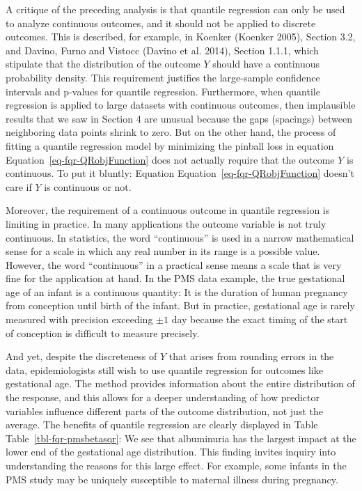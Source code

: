 \documentclass[
  letterpaper,
  DIV=11,
  numbers=noendperiod]{scrartcl}
\begin{document}
A critique of the preceding analysis is that quantile regression can
only be used to analyze continuous outcomes, and it should not be
applied to discrete outcomes. This is described, for example, in Koenker
(Koenker 2005), Section 3.2, and Davino, Furno and Vistocc (Davino et
al. 2014), Section 1.1.1, which stipulate that the distribution of the
outcome \(Y\) should have a continuous probability density. This
requirement justifies the large-sample confidence intervals and p-values
for quantile regression. Furthermore, when quantile regression is
applied to large datasets with continuous outcomes, then implausible
results that we saw in Section 4 are unusual because the gaps (spacings)
between neighboring data points shrink to zero. But on the other hand,
the process of fitting a quantile regression model by minimizing the
pinball loss in equation Equation~\ref{eq-fqr-QRobjFunction} does not
actually require that the outcome \(Y\) is continuous. To put it
bluntly: Equation Equation~\ref{eq-fqr-QRobjFunction} doesn't care if
\(Y\) is continuous or not.

Moreover, the requirement of a continuous outcome in quantile regression
is limiting in practice. In many applications the outcome variable is
not truly continuous. In statistics, the word ``continuous'' is used in
a narrow mathematical sense for a scale in which any real number in its
range is a possible value. However, the word ``continuous'' in a
practical sense means a scale that is very fine for the application at
hand. In the PMS data example, the true gestational age of an infant is
a continuous quantity: It is the duration of human pregnancy from
conception until birth of the infant. But in practice, gestational age
is rarely measured with precision exceeding \(\pm 1\) day because the
exact timing of the start of conception is difficult to measure
precisely.

And yet, despite the discreteness of \(Y\) that arises from rounding
errors in the data, epidemiologists still wish to use quantile
regression for outcomes like gestational age. The method provides
information about the entire distribution of the response, and this
allows for a deeper understanding of how predictor variables influence
different parts of the outcome distribution, not just the average. The
benefits of quantile regression are clearly displayed in Table
Table~\ref{tbl-fqr-pmsbetasqr}: We see that albuminuria has the largest
impact at the lower end of the gestational age distribution. This
finding invites inquiry into understanding the reasons for this large
effect. For example, some infants in the PMS study may be uniquely
susceptible to maternal illness during pregnancy.
\end{document}
